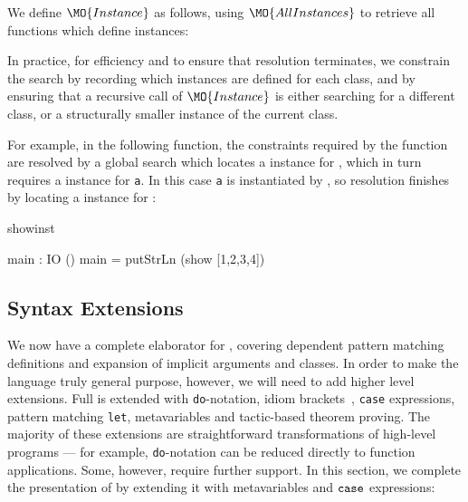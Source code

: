 
We define $\MO{Instance}$ as follows, using $\MO{AllInstances}$ to retrieve
all functions which define instances: 


In practice, for efficiency and to ensure that resolution terminates,
we constrain the search by recording which instances are defined for each
class, and by ensuring that a recursive call of $\MO{Instance}$ is either
searching for a different class, or a structurally smaller instance of the
current class. 

For example, in the following function, the constraints required by the
 function are resolved by a global search which locates a 
instance for , which in turn requires a  instance for
\texttt{a}.  In this case \texttt{a} is instantiated by , so resolution finishes
by locating a  instance for :

\begin{SaveVerbatim}{showinst}

main : IO ()
main = putStrLn (show [1,2,3,4]) 

\end{SaveVerbatim}

\subsection{Syntax Extensions}

We now have a complete elaborator for \IdrisM{}, covering 
dependent pattern matching definitions and expansion of implicit arguments
and classes. In order to make the language truly general purpose, however, we
will need to add higher level extensions. Full \Idris{} is \IdrisM{} extended
with \texttt{do}-notation, idiom brackets~\cite{McBride2007}, \texttt{case} expressions,
pattern matching \texttt{let}, metavariables and tactic-based theorem proving.
The majority of these extensions are straightforward transformations of high-level
\Idris{} programs --- for example, \texttt{do}-notation can be reduced directly to
\IdrisM{} function applications. Some, however, require further support. In this section,
we complete the presentation of \IdrisM{} by extending it with metavariables
and $\mathtt{case}$ expressions:

